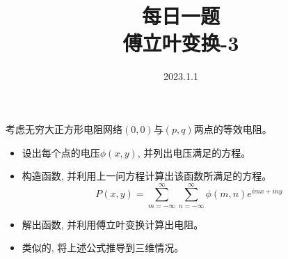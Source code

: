 \documentclass {ctexart}
\title {每日一题\\{\small 傅立叶变换-3}}
\date{2023.1.1}
\begin{document}
    \maketitle {}

    考虑无穷大正方形电阻网络\((0,0)\)与\((p,q)\)两点的等效电阻。
    \begin{itemize}
        \item 设出每个点的电压\(\phi(x,y)\), 并列出电压满足的方程。
        \item 构造函数, 并利用上一问方程计算出该函数所满足的方程。
                \begin{equation}
                    P(x,y) = \sum_{m=-\infty}^{\infty}\sum_{n=-\infty}^{\infty} \phi(m,n) e^{imx+iny}
                \end{equation}
        \item 解出函数, 并利用傅立叶变换计算出电阻。
        \item 类似的, 将上述公式推导到三维情况。
    \end{itemize}
\end{document}
